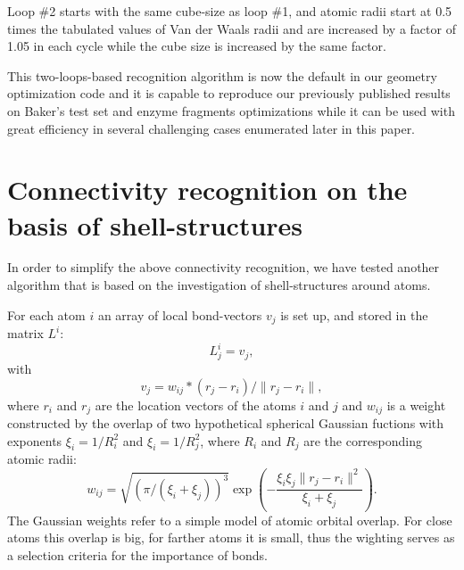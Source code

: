 \documentclass[prl,aps,preprint,superbib,12pt]{revtex4}
\begin{document}
Loop \#2 starts with the same cube-size as loop \#1, 
and atomic radii start at 0.5 times the tabulated values of 
Van der Waals radii \cite{webelements} and are increased by a 
factor of 1.05 in each cycle while the cube size is increased
by the same factor.

This two-loops-based recognition algorithm is now the default
in our geometry optimization code and it is capable to reproduce
our previously published results on Baker's test set and enzyme 
fragments optimizations \cite{KNemeth04} while it can
be used with great efficiency in several challenging cases
enumerated later in this paper.

\section{Connectivity recognition on the basis of shell-structures}
\label{shell}
In order to simplify the above connectivity recognition, we have
tested another algorithm that is based on the investigation
of shell-structures around atoms.

For each atom $i$ an array of local bond-vectors $v_{j}$ is set up,
and stored in the matrix $L^{i}$:
\begin{equation}
L^{i}_{j} = v_{j} ,
\end{equation}
with 
\begin{equation}
v_{j}=w_{ij}*(r_{j}-r_{i})/\|r_{j}-r_{i}\| ,
\end{equation}
where $r_{i}$ and $r_{j}$ are the location vectors of the atoms $i$ and 
$j$ and $w_{ij}$ is a weight constructed by the overlap of two
hypothetical spherical Gaussian fuctions with exponents
$\xi_{i}=1/R_{i}^{2}$ and $\xi_{i}=1/R_{j}^{2}$, where
$R_{i}$ and $R_{j}$ are the corresponding atomic radii:
\begin{equation}
w_{ij}=\sqrt{(\pi/(\xi_{i}+\xi_{j}))^{3}}   
\exp{\left( -\frac{\xi_{i}\xi_{j}\|r_{j}-r_{i}\|^{2}}{\xi_{i}+\xi_{j}}\right) } .
\end{equation}
The Gaussian weights refer to a simple model of atomic orbital overlap.
For close atoms this overlap is big, for farther atoms it is small, thus
the wighting serves as a selection criteria for the importance of bonds.
\end{document}
